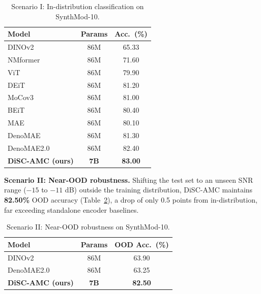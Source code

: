 \begin{table}[htbp]
\centering
\caption{Scenario I: In-distribution classification on SynthMod-10.}
\label{tab:disc_scenario1}
\begin{tabular}{lcc}
\toprule
Model & Params & Acc.\ (\%) \\
\midrule
DINOv2 & 86M & 65.33 \\
NMformer~\cite{faysal2024nmformer} & 86M & 71.60 \\
ViT~\cite{faysal2025denomae20improvingdenoisingmasked} & 86M & 79.90 \\
DEiT~\cite{faysal2025denomae20improvingdenoisingmasked} & 86M & 81.20 \\
MoCov3~\cite{faysal2025denomae20improvingdenoisingmasked} & 86M & 81.00 \\
BEiT~\cite{faysal2025denomae20improvingdenoisingmasked} & 86M & 80.40 \\
MAE~\cite{faysal2025denomae20improvingdenoisingmasked} & 86M & 80.10 \\
DenoMAE~\cite{faysal2025denomae} & 86M & 81.30 \\
DenoMAE2.0~\cite{faysal2025denomae20improvingdenoisingmasked} & 86M & 82.40 \\
\textbf{DiSC-AMC (ours)} & \textbf{7B} & \textbf{83.00} \\
\bottomrule
\end{tabular}
\end{table}

\textbf{Scenario II: Near-OOD robustness.} Shifting the test set to an unseen SNR range ($-15$ to $-11$ dB) outside the training distribution, DiSC-AMC maintains \textbf{82.50\%} OOD accuracy (Table~\ref{tab:disc_scenario2}), a drop of only 0.5 points from in-distribution, far exceeding standalone encoder baselines.

\begin{table}[htbp]
\centering
\caption{Scenario II: Near-OOD robustness on SynthMod-10.}
\label{tab:disc_scenario2}
\begin{tabular}{lcc}
\toprule
Model & Params & OOD Acc.\ (\%) \\
\midrule
DINOv2 & 86M & 63.90 \\
DenoMAE2.0~\cite{faysal2025denomae20improvingdenoisingmasked} & 86M & 63.25 \\
\textbf{DiSC-AMC (ours)} & \textbf{7B} & \textbf{82.50} \\
\bottomrule
\end{tabular}
\end{table}

